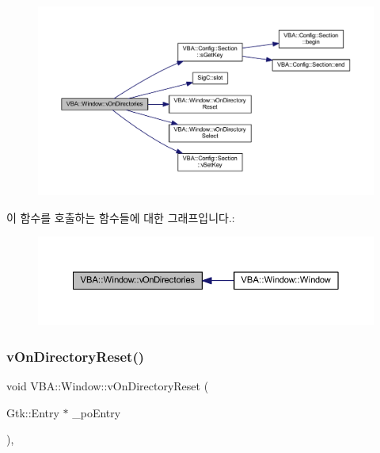 \nopagebreak
\begin{figure}[H]
\begin{center}
\leavevmode
\includegraphics[width=350pt]{class_v_b_a_1_1_window_ab0ff6c3b3ac5df7ab482be673ac02732_cgraph}
\end{center}
\end{figure}
이 함수를 호출하는 함수들에 대한 그래프입니다.\+:
\nopagebreak
\begin{figure}[H]
\begin{center}
\leavevmode
\includegraphics[width=350pt]{class_v_b_a_1_1_window_ab0ff6c3b3ac5df7ab482be673ac02732_icgraph}
\end{center}
\end{figure}
\mbox{\label{class_v_b_a_1_1_window_aedc6f08a9c1f1a54ec41347f96dfd213}} 
\subsubsection{\texorpdfstring{v\+On\+Directory\+Reset()}{vOnDirectoryReset()}}
{\footnotesize\ttfamily void V\+B\+A\+::\+Window\+::v\+On\+Directory\+Reset (\begin{DoxyParamCaption}\item[{Gtk\+::\+Entry $\ast$}]{\+\_\+po\+Entry }\end{DoxyParamCaption})\hspace{0.3cm}{\ttfamily [protected]}, {\ttfamily [virtual]}}



